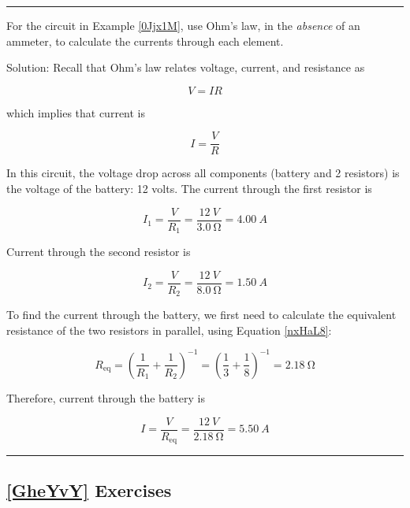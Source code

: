 \documentclass[dvipsnames]{article}
\begin{document}
\vspace{1em}

\hrule

\begin{example}
    For the circuit in Example \ref{0Jjx1M}, use Ohm's law, in the \textit{absence} of an ammeter, to calculate the currents through each element.
\end{example}

Solution: Recall that Ohm's law relates voltage, current, and resistance as

\begin{equation*}
    V = I R
\end{equation*}

which implies that current is

\begin{equation*}
    I = \frac{V}{R}
\end{equation*}

In this circuit, the voltage drop across all components (battery and 2 resistors) is the voltage of the battery: 12 volts. The current through the first resistor is

\begin{equation*}
        I_1 = \frac{V}{R_1} = \frac{\SI{12}{V}}{\SI{3.0}{\ohm}} =  \SI{4.00}{A}
\end{equation*}

Current through the second resistor is

\begin{equation*}
    I_2 = \frac{V}{R_2} = \frac{\SI{12}{V}}{\SI{8.0}{\ohm}} = \SI{1.50}{A}
\end{equation*}

To find the current through the battery, we first need to calculate the equivalent resistance of the two resistors in parallel, using Equation \ref{nxHaL8}:

\begin{equation*}
    R_{\mathrm{eq}} = \left(\frac{1}{R_1} + \frac{1}{R_2}\right)^{-1} = \left(\frac{1}{3} + \frac{1}{8}\right)^{-1} = \SI{2.18}{\ohm}
\end{equation*}

Therefore, current through the battery is

\begin{equation*}
    I = \frac{V}{R_{\text{eq}}} = \frac{\SI{12}{V}}{\SI{2.18}{\ohm}} = \SI{5.50}{A}
\end{equation*}

\hrule

\subsection*{\ref{GheYvY} Exercises}
\end{document}
